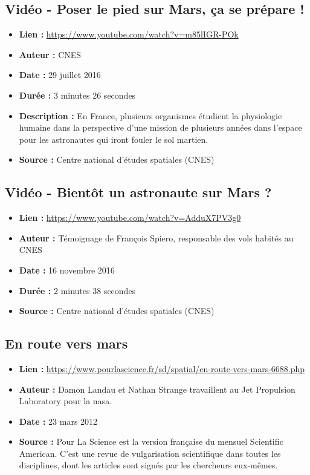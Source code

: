 \documentclass[8pt]{article}
\begin{document}
\subsection{Vidéo - Poser le pied sur Mars, ça se prépare !}
\begin{itemize}
	\item \textbf{Lien : }  \url{https://www.youtube.com/watch?v=m85lIGR-POk} 
	\item \textbf{Auteur : } CNES
	\item \textbf{Date : } 29 juillet 2016
	\item \textbf{Durée : } 3 minutes 26 secondes
	\item \textbf{Description : } En France, plusieurs organismes étudient la physiologie humaine dans la perspective d'une mission de plusieurs années dans l'espace pour les astronautes qui iront fouler le sol martien.
	\item \textbf{Source : } Centre national d'études spatiales (CNES)
\end{itemize}

\subsection{Vidéo - Bientôt un astronaute sur Mars ?}
\begin{itemize}
	\item \textbf{Lien : }  \url{https://www.youtube.com/watch?v=AdduX7PV3g0} 
	\item \textbf{Auteur : } Témoignage de François Spiero, responsable des vols habités au CNES
	\item \textbf{Date : } 16 novembre 2016
	\item \textbf{Durée : } 2 minutes 38 secondes
	\item \textbf{Source : } Centre national d'études spatiales (CNES)
\end{itemize}

\subsection{En route vers mars}
\begin{itemize}
	\item \textbf{Lien : }  \url{https://www.pourlascience.fr/sd/spatial/en-route-vers-mars-6688.php} 
	\item \textbf{Auteur : } Damon Landau et Nathan Strange travaillent au Jet Propulsion Laboratory pour la nasa.
	\item \textbf{Date : } 23 mars 2012
	\item \textbf{Source : } Pour La Science est la version française du mensuel Scientific American. C'est une revue de vulgarisation scientifique dans toutes les disciplines, dont les articles sont signés par les chercheurs eux-mêmes.
\end{itemize}


\end{document}

